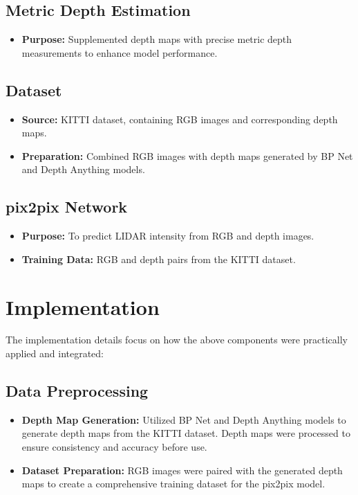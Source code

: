\subsection{Metric Depth Estimation}
\begin{itemize}
	\item \textbf{Purpose:} Supplemented depth maps with precise metric depth measurements to enhance model performance.
\end{itemize}

\subsection{Dataset}
\begin{itemize}
	\item \textbf{Source:} KITTI dataset, containing RGB images and corresponding depth maps.
	\item \textbf{Preparation:} Combined RGB images with depth maps generated by BP Net and Depth Anything models.
\end{itemize}

\subsection{pix2pix Network}
\begin{itemize}
	\item \textbf{Purpose:} To predict LIDAR intensity from RGB and depth images.
	\item \textbf{Training Data:} RGB and depth pairs from the KITTI dataset.
\end{itemize}

\section{Implementation}
The implementation details focus on how the above components were practically applied and integrated:

\subsection{Data Preprocessing}
\begin{itemize}
	\item \textbf{Depth Map Generation:} Utilized BP Net and Depth Anything models to generate depth maps from the KITTI dataset. Depth maps were processed to ensure consistency and accuracy before use.
	\item \textbf{Dataset Preparation:} RGB images were paired with the generated depth maps to create a comprehensive training dataset for the pix2pix model.
\end{itemize}


